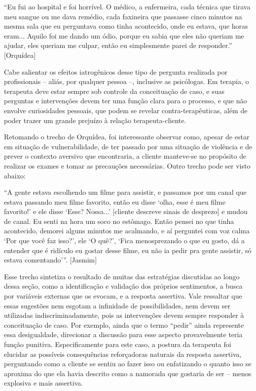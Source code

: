 ``Eu fui ao hospital e foi horrível. O médico, a enfermeira, cada técnica que tirava meu sangue ou me dava remédio, cada faxineira que passasse cinco minutos na mesma sala que eu perguntava como tinha acontecido, onde eu estava, que horas eram... Aquilo foi me dando um ódio, porque eu sabia que eles não queriam me ajudar, eles queriam me culpar, então eu simplesmente parei de responder.'' [Orquídea] 

Cabe salientar os efeitos iatrogênicos desse tipo de pergunta realizada por profissionais – aliás, por qualquer pessoa –, inclusive as psicólogas. Em terapia, o terapeuta deve estar sempre sob controle da conceituação de caso, e suas perguntas e intervenções devem ter uma função clara para o processo, e que não envolve curiosidades pessoais, que podem se revelar contra-terapêuticas, além de poder trazer um grande prejuízo à relação terapeuta-cliente.

Retomando o trecho de Orquídea, foi interessante observar como, apesar de estar em situação de vulnerabilidade, de ter passado por uma situação de violência e de prever o contexto aversivo que encontraria, a cliente manteve-se no propósito de realizar os exames e tomar as precauções necessárias. Outro trecho pode ser visto abaixo:

``A gente estava escolhendo um filme para assistir, e passamos por um canal que estava passando meu filme favorito, então eu disse ‘olha, esse é meu filme favorito!’ e ele disse ‘Esse? Nossa...’ [cliente descreve sinais de desprezo] e mudou de canal. Eu senti na hora um soco no estômago. Então pensei no que tinha acontecido, demorei alguns minutos me acalmando, e aí perguntei com voz calma ‘Por que você faz isso?’, ele ‘O quê?’, ‘Fica menosprezando o que eu gosto, dá a entender que é ridículo eu gostar desse filme, eu não ia pedir pra gente assistir, só estava comentando’''. [Jasmim]

Esse trecho sintetiza o resultado de muitas das estratégias discutidas ao longo dessa seção, como a identificação e validação dos próprios sentimentos, a busca por variáveis externas que os evocam, e a resposta assertiva. Vale ressaltar que essas sugestões nem esgotam a infinidade de possibilidades, nem devem ser utilizadas indiscriminadamente, pois as intervenções devem sempre responder à conceituação de caso. Por exemplo, ainda que o termo ``pedir'' ainda represente essa desigualdade, direcionar a discussão para esse aspecto provavelmente teria função punitiva. Especificamente para este caso, a postura da terapeuta foi elucidar as possíveis consequências reforçadoras naturais da resposta assertiva, perguntando como a cliente se sentiu ao fazer isso ou enfatizando o quanto isso se aproxima do que ela havia descrito como a namorada que gostaria de ser – menos explosiva e mais assertiva.

